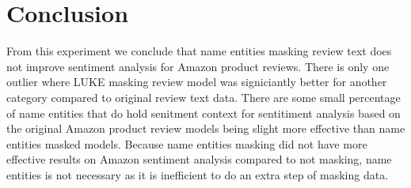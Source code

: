 \documentclass[11pt,a4paper]{article}
\begin{document}
\section{Conclusion}

From this experiment we conclude that name entities masking review text does not improve sentiment analysis for Amazon product reviews. There is only one outlier where LUKE masking review model was signiciantly better for another category compared to original review text data. There are some small percentage of name entities that do hold senitment context for sentitiment analysis based on the original Amazon product review models being slight more effective than name entities masked models. Because name entities masking did not have more effective results on Amazon sentiment analysis compared to not masking, name entities is not necessary as it is inefficient to do an extra step of masking data.



\end{document}
